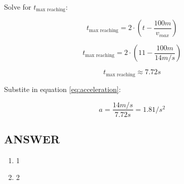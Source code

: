 Solve for $t_{\text{max reaching}}$:

$$t_{\text{max reaching}} = 2 \cdot (t - \frac{100m}{v_{max}})$$

$$t_{\text{max reaching}} = 2 \cdot (11 - \frac{100m}{14m/s})$$

$$t_{\text{max reaching}} \approx 7.72s$$

\newpage Substite in equation \ref{eq:acceleration}:

$$a = \frac{14m/s}{7.72s} = 1.81/s^2$$


\vfill \subsection*{ANSWER}
\begin{enumerate}
    \item 1
    \item 2
\end{enumerate}
